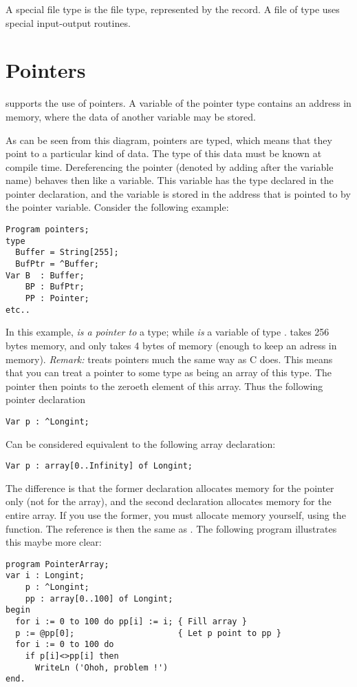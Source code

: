 \documentclass{report}
\begin{document}
A special file type is the  file type, represented by the
 record. A file of type  uses special input-output
routines.
\section{Pointers}
\fpc supports the use of pointers. A variable of the pointer type
contains an address in memory, where the data of another variable may be
stored.

As can be seen from this diagram, pointers are typed, which means that
they point to a particular kind of data. The type of this data must be
known at compile time.
Dereferencing the pointer (denoted by adding \var{\^{}} after the variable
name) behaves then like a variable. This variable has the type declared in
the pointer declaration, and the variable is stored in the address that is
pointed to by the pointer variable.
Consider the following example:
\begin{verbatim}
Program pointers;
type
  Buffer = String[255];
  BufPtr = ^Buffer;
Var B  : Buffer;
    BP : BufPtr;
    PP : Pointer;
etc..
\end{verbatim}
In this example,  {\em is a pointer to} a  type; while 
{\em is} a variable of type .  takes 256 bytes memory,
and  only takes 4 bytes of memory (enough to keep an adress in
memory).
{\em Remark:} \fpc treats pointers much the same way as C does. This means
that you can treat a pointer to some type as being an array of this type.
The pointer then points to the zeroeth element of this array. Thus the
following pointer declaration
\begin{verbatim}
Var p : ^Longint;
\end{verbatim}
Can be considered equivalent to the following array declaration:
\begin{verbatim}
Var p : array[0..Infinity] of Longint;
\end{verbatim}
The difference is that the former declaration allocates memory for the
pointer only (not for the array), and the second declaration allocates
memory for the entire array. If you use the former, you must allocate memory
yourself, using the  function.
The reference  is then the same as . The following program
illustrates this maybe more clear:
\begin{verbatim}
program PointerArray;
var i : Longint;
    p : ^Longint;
    pp : array[0..100] of Longint;
begin
  for i := 0 to 100 do pp[i] := i; { Fill array }
  p := @pp[0];                     { Let p point to pp }
  for i := 0 to 100 do
    if p[i]<>pp[i] then
      WriteLn ('Ohoh, problem !')
end.
\end{verbatim}
\end{document}
